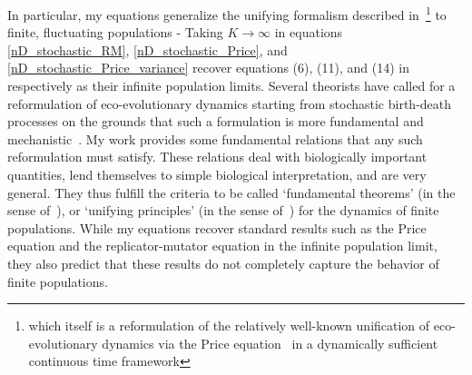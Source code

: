 In particular, my equations generalize the unifying formalism described in~\cite{lion_theoretical_2018}\footnote{which itself is a reformulation of the relatively well-known unification of eco-evolutionary dynamics via the Price equation~\citep{frank_natural_2012, queller_fundamental_2017, luque_mirror_2021} in a dynamically sufficient continuous time framework} to finite, fluctuating populations - Taking $K \to \infty$ in equations \eqref{nD_stochastic_RM}, \eqref{nD_stochastic_Price}, and \eqref{nD_stochastic_Price_variance} recover equations (6), (11), and (14) in~\cite{lion_theoretical_2018} respectively as their infinite population limits. Several theorists have called for a reformulation of eco-evolutionary dynamics starting from stochastic birth-death processes on the grounds that such a formulation is more fundamental and mechanistic~\citep{metcalf_why_2007,geritz_mathematical_2012,doebeli_towards_2017}. My work provides some fundamental relations that any such reformulation must satisfy. These relations deal with biologically important quantities, lend themselves to simple biological interpretation, and are very general. They thus fulfill the criteria to be called `fundamental theorems' (in the sense of~\cite{queller_fundamental_2017}), or `unifying principles' (in the sense of~\cite{lion_theoretical_2018}) for the dynamics of finite populations. While my equations recover standard results such as the Price equation and the replicator-mutator equation in the infinite population limit, they also predict that these results do not completely capture the behavior of finite populations.

